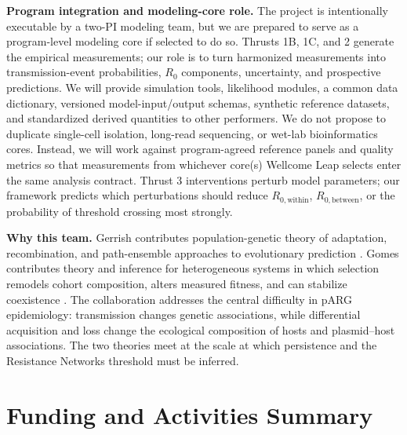 \documentclass[12pt,a4paper]{article}
\newcommand{\Rwithin}{R_{0,\mathrm{within}}}
\newcommand{\Rbetween}{R_{0,\mathrm{between}}}
\begin{document}
\textbf{Program integration and modeling-core role.} The project is intentionally executable by a two-PI modeling team, but we are prepared to serve as a program-level modeling core if selected to do so. Thrusts 1B, 1C, and 2 generate the empirical measurements; our role is to turn harmonized measurements into transmission-event probabilities, $R_0$ components, uncertainty, and prospective predictions. We will provide simulation tools, likelihood modules, a common data dictionary, versioned model-input/output schemas, synthetic reference datasets, and standardized derived quantities to other performers. We do not propose to duplicate single-cell isolation, long-read sequencing, or wet-lab bioinformatics cores. Instead, we will work against program-agreed reference panels and quality metrics so that measurements from whichever core(s) Wellcome Leap selects enter the same analysis contract. Thrust 3 interventions perturb model parameters; our framework predicts which perturbations should reduce $\Rwithin$, $\Rbetween$, or the probability of threshold crossing most strongly.

\textbf{Why this team.} Gerrish contributes population-genetic theory of adaptation, recombination, and path-ensemble approaches to evolutionary prediction \citep{gerrish1998,devisser1999,gerrish2012,gerrish2026sex}. Gomes contributes theory and inference for heterogeneous systems in which selection remodels cohort composition, alters measured fitness, and can stabilize coexistence \citep{gomes2019variation,gomes2022,gomes2024}. The collaboration addresses the central difficulty in pARG epidemiology: transmission changes genetic associations, while differential acquisition and loss change the ecological composition of hosts and plasmid--host associations. The two theories meet at the scale at which persistence and the Resistance Networks threshold must be inferred.

\newpage

\section*{Funding and Activities Summary}
\end{document}

